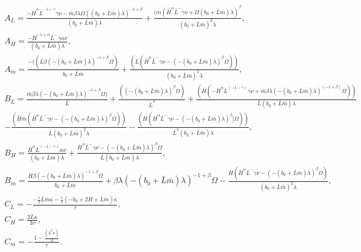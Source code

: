 \documentclass[tc, manuscript]{copernicus}
\begin{document}
\begin{multline*}
    A_L = \frac{-\bar{H}^\alpha \bar{L}^{-1 - \gamma} \gamma \nu - \bar{m} \beta \lambda \Omega((b_0 + \bar{L} \bar{m}) \lambda)^{-1 + \beta}}{(b_0 +\bar{L} \bar{m}) \lambda} + \frac{(\bar{m} (\bar{H}^\alpha \bar{L}^-\gamma \nu + \Omega(b_0 + \bar{L} \bar{m}) \lambda)^\beta}{(b_0+ \bar{L} \bar{m})^2 \lambda}, \\
    A_H =  \frac{- \bar{H}^{-1 + \alpha} \bar{L}^-\gamma \alpha \nu}{(b_0 + \bar{L} \bar{m}) \lambda}, \\
    A_m =  \frac{-((\bar{L} \beta (-(b_0 + \bar{L} \bar{m}) \lambda)^{-1 + \beta} \Omega)}{b_0 + \bar{L} \bar{m}} + \frac{(\bar{L} (\bar{H}^\alpha \bar{L}^-\gamma \nu - (-(b_0 + \bar{L} \bar{m}) \lambda)^\beta \Omega))}{(b_0 + \bar{L} \bar{m})^2 \lambda}, \\
    B_L = \frac{\bar{m} \beta \lambda (-(b_0 + \bar{L} \bar{m}) \lambda)^{-1 + \beta} \Omega)}{\bar{L}} + \frac{((-(b_0 + \bar{L} \bar{m}) \lambda)^\beta \Omega)}{\bar{L}^2} + \frac{(\bar{H} (-\bar{H}^\alpha \bar{L}^(-1 - \gamma) \gamma \nu + \bar{m} \beta \lambda (-(b_0 + \bar{L} \bar{m}) \lambda)^(-1 + \beta) \Omega))}{\bar{L} (b_0 + \bar{L} \bar{m}) \lambda} \\
    - \frac{(\bar{H} \bar{m} (\bar{H}^\alpha \bar{L}^-\gamma \nu - (-(b_0 + \bar{L} \bar{m}) \lambda)^\beta \Omega))}{\bar{L} (b_0 + \bar{L} \bar{m})^2 \lambda} - \frac{(\bar{H} (\bar{H}^\alpha \bar{L}^-\gamma \nu - (-(b_0 + \bar{L} \bar{m}) \lambda)^\beta] \Omega))}{\bar{L}^2 (b_0 + \bar{L} \bar{m}) \lambda}, \\
    B_H = \frac{\bar{H}^\alpha \bar{L}^(-1 - \gamma) \alpha \nu}{(b_0 + \bar{L} \bar{m}) \lambda} + \frac{\bar{H}^\alpha \bar{L}^-\gamma \nu - (-(b_0 + \bar{L} \bar{m}) \lambda)^\beta \Omega}{\bar{L} (b_0 +\bar{ L} \bar{m}) \lambda}, \\
    B_m = \frac{\bar{H} \beta (-(b_0 + \bar{L} \bar{m}) \lambda)^{-1 + \beta} \Omega}{b_0 + \bar{L} \bar{m}} + \beta \lambda (-(b_0 + \bar{L} \bar{m}) \lambda)^{-1 + \beta} \Omega - \frac{\bar{H} (\bar{H}^\alpha \bar{L}^-\gamma \nu - (-(b_0 + \bar{L} \bar{m}) \lambda)^\beta \Omega)}{(b_0 + \bar{L} \bar{m})^2 \lambda}, \\
    C_L =-\frac{-\frac{1}{3} \bar{L} \bar{m} \kappa - 
  \frac{1}{3} (-b_0 + 2\bar{H} + \bar{L} \bar{m}) \kappa}{\tau}, \\
    C_H=\frac{2 \bar{L} \kappa}{3 \tau}, \\
    C_m=-\frac{1 - \frac{(\bar{L}^2 \kappa)}{3}}{\tau}. \\
\end{multline*}
     
\end{document}
